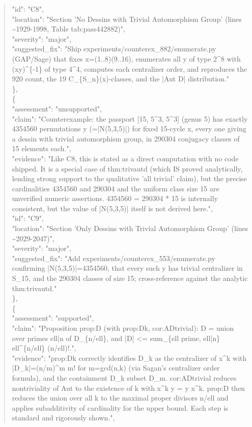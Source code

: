 \documentclass[11pt]{article}
\begin{document}
\begin{quote}
      "id": "C8",\\
      "location": "Section 'No Dessins with Trivial Automorphism Group' (lines \~{}1929-1998, Table tab:pass442882)",\\
      "severity": "major",\\
      "suggested\_fix": "Ship experiments/counterex\_882/enumerate.py (GAP/Sage) that fixes x=(1..8)(9..16), enumerates all y of type 2\^{}8 with (xy)\^{}\{-1\} of type 4\^{}4, computes each centralizer order, and reproduces the 920 count, the 19 C\_\{S\_n\}(x)-classes, and the |Aut D| distribution."\\
    \},\\
    \{\\
      "assessment": "unsupported",\\
      "claim": "Counterexample: the passport [15, 5\^{}3, 5\^{}3] (genus 5) has exactly 4354560 permutations y (=|N(5,3,5)|) for fixed 15-cycle x, every one giving a dessin with trivial automorphism group, in 290304 conjugacy classes of 15 elements each.",\\
      "evidence": "Like C8, this is stated as a direct computation with no code shipped. It is a special case of thm:trivautd (which IS proved analytically, lending strong support to the qualitative 'all trivial' claim), but the precise cardinalities 4354560 and 290304 and the uniform class size 15 are unverified numeric assertions. 4354560 = 290304 * 15 is internally consistent, but the value of |N(5,3,5)| itself is not derived here.",\\
      "id": "C9",\\
      "location": "Section 'Only Dessins with Trivial Automorphism Group' (lines \~{}2029-2047)",\\
      "severity": "major",\\
      "suggested\_fix": "Add experiments/counterex\_553/enumerate.py confirming |N(5,3,5)|=4354560, that every such y has trivial centralizer in S\_15, and the 290304 classes of size 15; cross-reference against the analytic thm:trivautd."\\
    \},\\
    \{\\
      "assessment": "supported",\\
      "claim": "Proposition prop:D (with prop:Dk, cor:ADtrivial): D = union over primes ell|n of D\_\{n/ell\}, and |D| <= sum\_\{ell prime, ell|n\} ell\^{}\{n/ell\} (n/ell)!.",\\
      "evidence": "prop:Dk correctly identifies D\_k as the centralizer of x\^{}k with |D\_k|=(n/m)\^{}m m! for m=gcd(n,k) (via Sagan's centralizer order formula), and the containment D\_k subset D\_m. cor:ADtrivial reduces nontriviality of Aut to the existence of k with x\^{}k y = y x\^{}k. prop:D then reduces the union over all k to the maximal proper divisors n/ell and applies subadditivity of cardinality for the upper bound. Each step is standard and rigorously shown.",\\

\end{quote}
\end{document}
